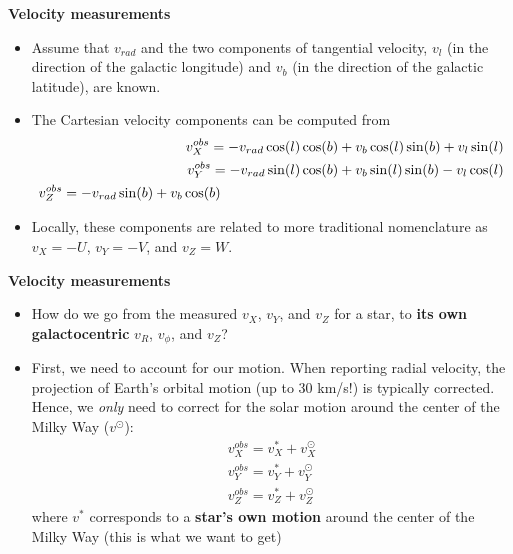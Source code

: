 \documentclass[letterpaper,landscape]{slides}
\begin{document}
\begin{slide}

\begin{center}
\bfseries
\large {} Velocity measurements 
\end{center}
\vskip 0.2in
\begin{itemize}
\item Assume that $v_{rad}$ and the two components of tangential 
velocity, $v_l$ (in the direction of the galactic longitude) and
$v_b$ (in the direction of the galactic latitude), are known.
\item The Cartesian velocity components can be computed from 
\begin{eqnarray} 
 v_X^{obs} = -v_{rad} \cos(l) \cos(b) + v_b \cos(l) \sin(b) + v_l \sin(l) \nonumber \\
 v_Y^{obs} = -v_{rad} \sin(l) \cos(b) + v_b \sin(l) \sin(b) - v_l \cos(l) \nonumber \\
 v_Z^{obs} = -v_{rad} \sin(b) + v_b \cos(b)   \hskip 2.8in                            \nonumber
\end{eqnarray} 
\item Locally, these components are related to more traditional nomenclature
as $v_X=-U$, $v_Y=-V$, and $v_Z=W$. 
\end{itemize}    
\vfill

\end{slide}


\begin{slide}

\begin{center}
\bfseries
\large {} Velocity measurements 
\end{center}
\vskip 0.2in
\begin{itemize}
\item How do we go from the measured $v_X$, $v_Y$, and $v_Z$ for
a star, to {\bf its own galactocentric} $v_R$, $v_\phi$, and $v_Z$? 
\item First, {\color{blue} we need to account for our motion}. When reporting
radial velocity, the projection of Earth's orbital motion 
(up to 30 km/s!) is typically corrected. Hence, we {\it only} 
need to correct for the solar motion around the center of the
Milky Way ($v^\odot$):
\begin{eqnarray} 
           v_X^{obs} = v_X^\ast + v_X^\odot  \nonumber \\
           v_Y^{obs} = v_Y^\ast + v_Y^\odot  \nonumber \\
           v_Z^{obs} = v_Z^\ast + v_Z^\odot  \nonumber    
\end{eqnarray} 
where $v^\ast$ corresponds to a {\bf star's own motion} around the center 
of the Milky Way (this is what we want to get)
\end{itemize}    
\vfill

\end{slide}
\end{document}
